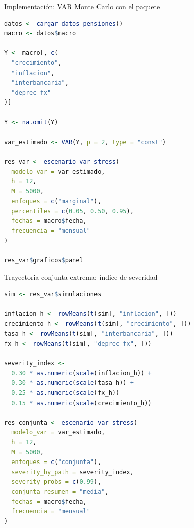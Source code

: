 \documentclass[10pt,aspectratio=169]{beamer}
\begin{document}
\begin{frame}[fragile]{Implementación: VAR Monte Carlo con el paquete}
\begin{lstlisting}[language=R,basicstyle=\ttfamily\scriptsize]
datos <- cargar_datos_pensiones()
macro <- datos$macro

Y <- macro[, c(
  "crecimiento",
  "inflacion",
  "interbancaria",
  "deprec_fx"
)]

Y <- na.omit(Y)

var_estimado <- VAR(Y, p = 2, type = "const")

res_var <- escenario_var_stress(
  modelo_var = var_estimado,
  h = 12,
  M = 5000,
  enfoques = c("marginal"),
  percentiles = c(0.05, 0.50, 0.95),
  fechas = macro$fecha,
  frecuencia = "mensual"
)

res_var$graficos$panel
\end{lstlisting}
\end{frame}

\begin{frame}[fragile]{Trayectoria conjunta extrema: índice de severidad}
\begin{lstlisting}[language=R,basicstyle=\ttfamily\scriptsize]
sim <- res_var$simulaciones

inflacion_h <- rowMeans(t(sim[, "inflacion", ]))
crecimiento_h <- rowMeans(t(sim[, "crecimiento", ]))
tasa_h <- rowMeans(t(sim[, "interbancaria", ]))
fx_h <- rowMeans(t(sim[, "deprec_fx", ]))

severity_index <-
  0.30 * as.numeric(scale(inflacion_h)) +
  0.30 * as.numeric(scale(tasa_h)) +
  0.25 * as.numeric(scale(fx_h)) -
  0.15 * as.numeric(scale(crecimiento_h))

res_conjunta <- escenario_var_stress(
  modelo_var = var_estimado,
  h = 12,
  M = 5000,
  enfoques = c("conjunta"),
  severity_by_path = severity_index,
  severity_probs = c(0.99),
  conjunta_resumen = "media",
  fechas = macro$fecha,
  frecuencia = "mensual"
)
\end{lstlisting}
\end{frame}
\end{document}
